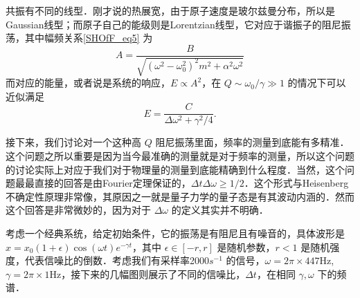 共振有不同的线型．刚才说的热展宽，由于原子速度是玻尔兹曼分布，所以是Gaussian线型；而原子自己的能级则是Lorentzian线型，它对应于谐振子的阻尼振荡，其中幅频关系\autoref{SHOfF_eq5} 为
\begin{equation}
A = \frac{B}{\sqrt{(\omega^2 - \omega_0^2)^2 m^2 + \alpha^2\omega^2}}
\end{equation}
而对应的能量，或者说是系统的响应，$E\propto A^2$，在 $Q\sim\omega_0/\gamma\gg1$ 的情况下可以近似满足
\begin{equation}
E = \frac{C}{\Delta\omega^2 + \gamma^2/4}. 
\end{equation}

接下来，我们讨论对一个这种高 $Q$ 阻尼振荡里面，频率的测量到底能有多精准．这个问题之所以重要是因为当今最准确的测量就是对于频率的测量，所以这个问题的讨论实际上对应于我们对于物理量的测量到底能精确到什么程度．当然，这个问题最最直接的回答是由Fourier定理保证的，$\Delta t\Delta \omega\ge1/2$．这个形式与Heisenberg不确定性原理非常像，其原因之一就是量子力学的量子态是有其波动内涵的．然而这个回答是非常微妙的，因为对于 $\Delta\omega$ 的定义其实并不明确．

考虑一个经典系统，给定初始条件，它的振荡是有阻尼且有噪音的，具体波形是 $x=x_0(1+\epsilon)\cos(\omega t)e^{-\gamma t}$，其中 $\epsilon\in[-r,r]$ 是随机参数，$r<1$ 是随机强度，代表信噪比的倒数．考虑我们有采样率2000$s^{-1}$ 的信号，$\omega=2\pi\times447$Hz, $\gamma=2\pi\times1$Hz，接下来的几幅图则展示了不同的信噪比，$\Delta t$，在相同 $\gamma, \omega$ 下的频谱．

